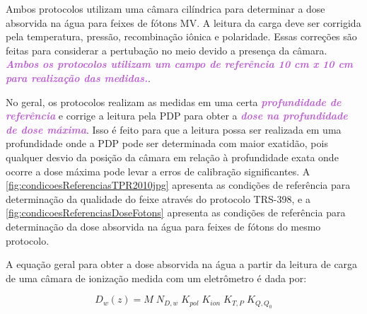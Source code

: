 \documentclass[11pt,a4paper]{article}
\begin{document}
    Ambos protocolos utilizam uma câmara cilíndrica para determinar a dose absorvida na água para feixes de fótons MV.  A leitura da carga deve ser corrigida pela temperatura, pressão, recombinação iônica e polaridade. Essas correções são feitas para considerar a pertubação no meio devido a presença da câmara. \textcolor{MediumOrchid}{\textit{\textbf{Ambos os protocolos utilizam um campo de referência 10 cm x 10 cm para realização das medidas.}}}.

    No geral, os protocolos realizam as medidas em uma certa \textcolor{MediumOrchid}{\textit{\textbf{profundidade de referência}}} e corrige a leitura pela PDP para obter a \textcolor{MediumOrchid}{\textit{\textbf{dose na profundidade de dose máxima}}}. Isso é feito para que a leitura possa ser realizada em uma profundidade onde a PDP pode ser determinada com maior exatidão, pois qualquer desvio da posição da câmara em relação à profundidade exata onde ocorre a dose máxima pode levar a erros de calibração significantes. A \ref{fig:condicoesReferenciasTPR2010jpg} apresenta as condições de referência para determinação da qualidade do feixe através do protocolo TRS-398, e a \ref{fig:condicoesReferenciasDoseFotons} apresenta as condições de referência para determinação da dose absorvida na água para feixes de fótons do mesmo protocolo.

    A equação geral para obter a dose absorvida na água a partir da leitura de carga de uma câmara de ionização medida com um eletrômetro é dada por:

  		$$D_{w}(z) = M \; N_{D,w} \; K_{pol} \; K_{ion} \; K_{T,P} \; K_{Q,Q_0}$$
\end{document}
